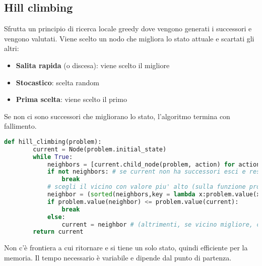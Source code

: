 \subsection{Hill climbing}
Sfrutta un principio di ricerca locale greedy dove vengono generati i successori e vengono valutati. Viene scelto un nodo che migliora lo stato attuale e scartati gli altri:
\begin{itemize}
	\item \textbf{Salita rapida} (o discesa): viene scelto il migliore
	\item \textbf{Stocastico}: scelta random
	\item \textbf{Prima scelta}: viene scelto il primo 
\end{itemize}
Se non ci sono successori che migliorano lo stato, l'algoritmo termina con fallimento.
\begin{lstlisting}[language=Python]
	def hill_climbing(problem):
		current = Node(problem.initial_state)
		while True:
			neighbors = [current.child_node(problem, action) for action in problem.actions(current.state)]
			if not neighbors: # se current non ha successori esci e restituisci current
				break
			# scegli il vicino con valore piu' alto (sulla funzione problem.value)
			neighbor = (sorted(neighbors,key = lambda x:problem.value(x), reverse = True))[0]
			if problem.value(neighbor) <= problem.value(current):
				break
			else:
				current = neighbor # (altrimenti, se vicino migliore, continua)
		return current
\end{lstlisting}
Non c'è frontiera a cui ritornare e si tiene un solo stato, quindi efficiente per la memoria. Il tempo necessario è variabile e dipende dal punto di partenza.\\

